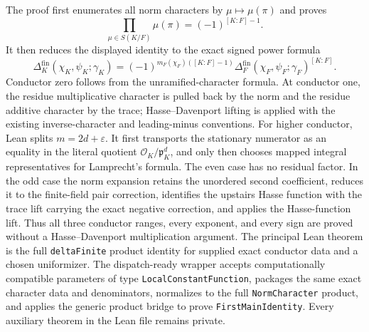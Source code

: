 \begin{theorem}
The proof first enumerates all norm characters by
$\mu\mapsto\mu(\pi)$ and proves
\[
 \prod_{\mu\in S(K/F)}\mu(\pi)=(-1)^{[K:F]-1}.
\]
It then reduces the displayed identity to the exact signed power formula
\[
 \Delta_K^{\mathrm{fin}}(\chi_K,\psi_K;\gamma_K)
 =(-1)^{m_F(\chi_F)([K:F]-1)}
  \Delta_F^{\mathrm{fin}}(\chi_F,\psi_F;\gamma_F)^{[K:F]}.
\]
Conductor zero follows from the unramified-character formula.  At conductor
one, the residue multiplicative character is pulled back by the norm and
the residue additive character by the trace; Hasse--Davenport lifting is
applied with the existing inverse-character and leading-minus conventions.
For higher conductor, Lean splits $m=2d+\varepsilon$.  It first transports
the stationary numerator as an equality in the literal quotient
$\mathcal O_K/\mathfrak p_K^d$, and only then chooses mapped integral
representatives for Lamprecht's formula.  The even case has no residual
factor.  In the odd case the norm expansion retains the unordered second
coefficient, reduces it to the finite-field pair correction, identifies the
upstairs Hasse function with the trace lift carrying the exact negative
correction, and applies the Hasse-function lift.  Thus all three conductor
ranges, every exponent, and every sign are proved without a
Hasse--Davenport multiplication argument.
\leanok
{}
\FormalizationContract The principal Lean theorem is the full
\texttt{deltaFinite} product identity for supplied exact conductor data and
a chosen uniformizer.  The dispatch-ready wrapper accepts computationally
compatible parameters of type \texttt{LocalConstantFunction}, packages the
same exact character data and denominators, normalizes to the full
\texttt{NormCharacter} product, and applies the generic product bridge to
prove \texttt{FirstMainIdentity}.  Every auxiliary theorem in the Lean file
remains private.
\end{theorem}
